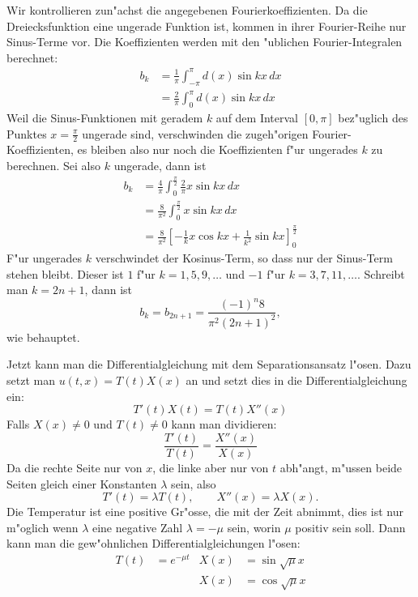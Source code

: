 \begin{loesung}
Wir kontrollieren zun"achst die angegebenen Fourierkoeffizienten.
Da die Dreiecksfunktion eine ungerade Funktion ist, kommen in ihrer
Fourier-Reihe nur Sinus-Terme vor. Die Koeffizienten werden mit
den "ublichen Fourier-Integralen berechnet:
\begin{align*}
b_k&=\frac{1}{\pi}\int_{-\pi}^{\pi} d(x)\sin kx\,dx\\
&=\frac{2}{\pi}\int_{0}^{\pi} d(x)\sin kx\,dx
\end{align*}
Weil die Sinus-Funktionen mit geradem $k$ auf dem Interval $[0,\pi]$
bez"uglich des Punktes $x=\frac{\pi}2$ ungerade sind, verschwinden die
zugeh"origen Fourier-Koeffizienten, es bleiben also nur noch die
Koeffizienten f"ur ungerades $k$ zu berechnen. Sei also $k$ ungerade, dann
ist
\begin{align*}
b_k
&=
\frac{4}{\pi}\int_0^{\frac{\pi}2} \frac{2}{\pi}x\sin kx\,dx
\\
&=
\frac{8}{\pi^2}\int_0^{\frac{\pi}2} x\sin kx\,dx
\\
&=
\frac{8}{\pi^2}\left[ -\frac{1}kx\cos kx+\frac1{k^2}\sin kx\right]_0^{\frac{\pi}2}
\end{align*}
F"ur ungerades $k$ verschwindet der Kosinus-Term, so dass nur der Sinus-Term
stehen bleibt. Dieser ist $1$ f"ur $k=1,5,9,\dots$ und $-1$ f"ur $k=3,7,11,\dots$.
Schreibt man $k=2n+1$, dann ist
\[
b_k=b_{2n+1}=\frac{(-1)^n8}{\pi^2(2n+1)^2},
\]
wie behauptet.

Jetzt kann man die Differentialgleichung mit dem Separationsansatz
l"osen. Dazu setzt man $u(t,x)=T(t)X(x)$ an und setzt dies in die
Differentialgleichung ein:
\[
T'(t)X(t)=T(t)X''(x)
\]
Falls $X(x)\ne 0$ und $T(t)\ne 0$ kann man dividieren:
\[
\frac{T'(t)}{T(t)}=\frac{X''(x)}{X(x)}
\]
Da die rechte Seite nur von $x$, die linke aber nur von $t$ abh"angt,
m"ussen beide Seiten gleich einer Konstanten $\lambda$ sein, also
\[
T'(t)=\lambda T(t),\qquad X''(x)=\lambda X(x).
\]
Die Temperatur ist eine positive Gr"osse, die mit der Zeit abnimmt,
dies ist nur m"oglich wenn $\lambda$ eine negative Zahl $\lambda=-\mu$
sein, worin $\mu$ positiv sein soll. Dann kann man die gew"ohnlichen
Differentialgleichungen l"osen:
\begin{align*}
T(t)&=e^{-\mu t}&X(x)&=\sin\sqrt{\mu}x\\
    &            &X(x)&=\cos\sqrt{\mu}x
\end{align*}


\end{loesung}
